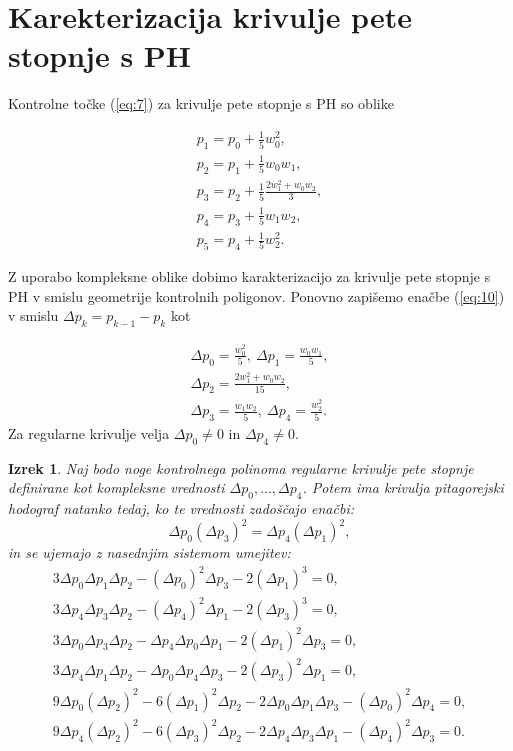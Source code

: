 \documentclass[a4paper]{IEEEtran}
\newtheorem{theorem}{Izrek}
\begin{document}
	
	\section{Karekterizacija krivulje pete stopnje s PH}
	Kontrolne točke (\ref{eq:7}) za krivulje pete stopnje s PH so oblike
	
	\begin{eqnarray}\label{eq:10}
	p_1=p_0+\frac{1}{5}w_0^2, \nonumber \\
	p_2=p_1+\frac{1}{5}w_0w_1, \nonumber \\
	p_3=p_2+\frac{1}{5}\frac{2w_1^2+w_0w_2}{3}, \nonumber \\
	p_4=p_3+\frac{1}{5}w_1w_2, \nonumber \\
	p_5=p_4+\frac{1}{5}w_2^2. 
	\end{eqnarray}
	
	Z uporabo kompleksne oblike dobimo karakterizacijo za krivulje pete stopnje s PH v smislu geometrije kontrolnih poligonov. Ponovno zapišemo enačbe (\ref{eq:10}) v smislu $\Delta p_k=p_{k-1}-p_k$ kot
	
	\begin{eqnarray}\label{eq:11}
	\Delta p_0=\frac{w_0^2}{5}, \ \Delta p_1=\frac{w_0w_1}{5}, \nonumber \\
	\Delta p_2=\frac{2w_1^2+w_0w_2}{15}, \nonumber \\
	\Delta p_3=\frac{w_1w_2}{5}, \ \Delta p_4=\frac{w_2^2}{5}.
	\end{eqnarray}
	Za regularne krivulje velja $\Delta p_0 \neq 0$ in $\Delta p_4 \neq 0$.
	
	\begin{theorem}
	Naj bodo noge kontrolnega polinoma regularne krivulje pete stopnje definirane kot kompleksne vrednosti $\Delta p_0,...,\Delta p_4$. Potem ima krivulja pitagorejski hodograf natanko tedaj, ko te vrednosti zadoščajo enačbi:
	\begin{equation}\label{eq:12}
	\Delta p_0(\Delta p_3)^2=\Delta p_4(\Delta p_1)^2,
	\end{equation}
	in se ujemajo z nasednjim sistemom umejitev:
	\begin{eqnarray}\label{eq:13}
	3\Delta p_0\Delta p_1\Delta p_2-(\Delta p_0)^2\Delta p_3-2(\Delta p_1)^3=0, \nonumber \\
	3\Delta p_4\Delta p_3\Delta p_2-(\Delta p_4)^2\Delta p_1-2(\Delta p_3)^3=0, \nonumber \\
	3\Delta p_0\Delta p_3\Delta p_2-\Delta p_4\Delta p_0\Delta p_1-2(\Delta p_1)^2\Delta p_3=0, \nonumber \\
	3\Delta p_4\Delta p_1\Delta p_2-\Delta p_0\Delta p_4\Delta p_3-2(\Delta p_3)^2\Delta p_1=0, \nonumber \\
	9\Delta p_0(\Delta p_2)^2-6(\Delta p_1)^2\Delta p_2-2\Delta p_0\Delta p_1 \Delta p_3-(\Delta p_0)^2\Delta p_4=0, \nonumber \\
	9\Delta p_4(\Delta p_2)^2-6(\Delta p_3)^2\Delta p_2-2\Delta p_4\Delta p_3 \Delta p_1-(\Delta p_4)^2\Delta p_3=0.
	\end{eqnarray}
	\end{theorem}
	
\end{document}
